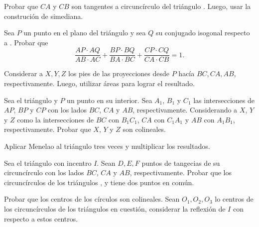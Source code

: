 \begin{hint}
    Probar que $CA$ y $CB$ son tangentes a circuncírculo del triángulo .
    Luego, usar la construción de simediana.
\end{hint}



\begin{section-problem}
    Sea $P$ un punto en el plano del triángulo  y sea $Q$ su conjugado isogonal respecto a .
    Probar que
    \[
        \frac{AP \cdot AQ}{AB \cdot AC} + \frac{BP \cdot BQ}{BA \cdot BC} + \frac{CP \cdot CQ}{CA \cdot CB} = 1.
    \]
\end{section-problem}

\begin{hint}
    Considerar a $X, Y, Z$ los pies de las proyecciones desde $P$ hacía $BC, CA, AB$, respectivamente.
    Luego, utilizar áreas para lograr el resultado.
\end{hint}


\begin{section-problem}
    Sea el triángulo  y $P$ un punto en su interior.
    Sea $A_1$, $B_1$ y $C_1$ las intersecciones de $AP$, $BP$ y $CP$ con los lados $BC$, $CA$ y $AB$, respectivamente.
    Considerando a $X$, $Y$ y $Z$ como la intersecciones de $BC$ con $B_1 C_1$, $CA$ con $C_1 A_1$ y $AB$ con $A_1 B_1$, respectivamente.
    Probar que $X$, $Y$ y $Z$ son colineales.
\end{section-problem}

\begin{hint}
    Aplicar Menelao al triángulo  tres veces y multiplicar los resultados.
\end{hint}


\begin{section-problem}
    Sea el triángulo  con incentro $I$.
    Sean $D, E, F$ puntos de tangecias de su circuncírculo con los lados $BC$, $CA$ y $AB$, respectivamente.
    Probar que los circuncírculos de los triángulos ,  y  tiene dos puntos en común.
\end{section-problem}

\begin{hint}
    Probar que los centros de los círculos son colineales.
    Sean $O_1, O_2, O_3$ lo centros de los circuncírculos de los triángulos en cuestión, considerar la reflexión de $I$ con respecto a estos centros.
\end{hint}


